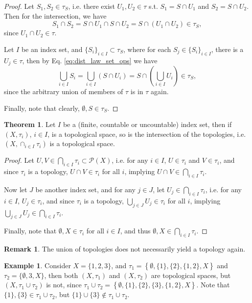 \documentclass[12pt, a4paper]{article}
\numberwithin{equation}{section}
\theoremstyle{definition}
\theoremstyle{definition}
\newtheorem{exmp}[thm]{Example} %
\newtheorem{remark}[thm]{Remark} %
\newtheorem{theorem}[thm]{Theorem}
\begin{document}
		\begin{proof}
			Let $S_1, S_2\in \tau_S$, i.e. there exist $U_1, U_2\in \tau$ s.t. $S_1 = S\cap U_1$ and $S_2 = S\cap U_2$. Then for the intersection, we have 
			$$S_1 \cap S_2 = S\cap U_1\cap S\cap U_2 = S\cap (U_1\cap U_2) \in \tau_S, $$ since $U_1\cap U_2\in \tau$. 
			
			Let $I$ be an index set, and $\{S_i\}_{i\in I}\subset \tau_S$, where for each $S_j\in \{S_i\}_{i\in I}$, there is a $U_j\in \tau$, then by Eq. \eqref{eq:dist_law_set_ops} we have 
			$$\bigcup_{i\in I}S_i = \bigcup_{i\in I}\left(S\cap U_i\right) = S\cap \left(\bigcup_{i\in I}U_i\right)\in \tau_S,$$
			since the arbitrary union of members of $\tau$ is in $\tau$ again.
			
			Finally, note that clearly, $\emptyset, S\in \tau_S$.
		\end{proof}
	
		\begin{theorem}
			Let $I$ be a (finite, countable or uncountable) index set, then if $(X, \tau_i)$, $i\in I$, is a topological space, so is the intersection of the topologies, i.e. $\left(X, \cap_{i\in I}\tau_i\right)$ is a topological space.
		\end{theorem}
	
		\begin{proof}
			Let $U, V\in \bigcap_{i\in I}\tau_i \subset \mathcal P(X)$, i.e. for any $i\in I$, $U\in\tau_i$ and $V\in \tau_i$, and since $\tau_i$ is a topology, $U\cap V\in\tau_i$ for all $i$, implying $U\cap V\in\bigcap_{i\in I}\tau_i$.
			
			Now let $J$ be another index set, and for any $j\in J$, let $U_j\in \bigcap_{i\in I}\tau_i$, i.e. for any $i\in I$, $U_j\in \tau_i$, and since $\tau_i$ is a topology, $\bigcup_{j\in J}U_j\in \tau_i$ for all $i$, implying $\bigcup_{j\in J}U_j\in \bigcap_{i\in I}\tau_i$.
			
			Finally, note that $\emptyset, X\in \tau_i$ for all $i\in I$, and thus $\emptyset, X\in \bigcap_{i\in I}\tau_i$.
		\end{proof}
		
		\begin{remark}
			The union of topologies does not necessarily yield a topology again.
		\end{remark}
		
		\begin{exmp}
			Consider $X = \{1, 2, 3\}$, and $\tau_1 = \left\{\emptyset, \{1\}, \{2\}, \{1, 2\}, X\right\}$ and $\tau_2=\{\emptyset, {3}, X\}$, then both $(X, \tau_1)$ and $(X, \tau_2)$ are topological spaces, but $(X, \tau_1\cup\tau_2)$ is not, since $\tau_1\cup \tau_2 = \left\{ \emptyset, \{1\}, \{2\}, \{3\}, \{1, 2\}, X \right\}$. Note that $\{1\}, \{3\}\in \tau_1\cup \tau_2$, but $\{1\}\cup \{3\}\notin \tau_1\cup\tau_2$.
		\end{exmp}
		
\end{document}
